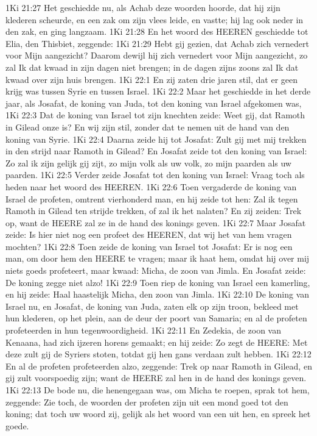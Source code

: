 1Ki 21:27  Het geschiedde nu, als Achab deze woorden hoorde, dat hij zijn klederen scheurde, en een zak om zijn vlees leide, en vastte; hij lag ook neder in den zak, en ging langzaam.
1Ki 21:28  En het woord des HEEREN geschiedde tot Elia, den Thisbiet, zeggende:
1Ki 21:29  Hebt gij gezien, dat Achab zich vernedert voor Mijn aangezicht? Daarom dewijl hij zich vernedert voor Mijn aangezicht, zo zal Ik dat kwaad in zijn dagen niet brengen; in de dagen zijns zoons zal Ik dat kwaad over zijn huis brengen.
1Ki 22:1  En zij zaten drie jaren stil, dat er geen krijg was tussen Syrie en tussen Israel.
1Ki 22:2  Maar het geschiedde in het derde jaar, als Josafat, de koning van Juda, tot den koning van Israel afgekomen was,
1Ki 22:3  Dat de koning van Israel tot zijn knechten zeide: Weet gij, dat Ramoth in Gilead onze is? En wij zijn stil, zonder dat te nemen uit de hand van den koning van Syrie.
1Ki 22:4  Daarna zeide hij tot Josafat: Zult gij met mij trekken in den strijd naar Ramoth in Gilead? En Josafat zeide tot den koning van Israel: Zo zal ik zijn gelijk gij zijt, zo mijn volk als uw volk, zo mijn paarden als uw paarden.
1Ki 22:5  Verder zeide Josafat tot den koning van Israel: Vraag toch als heden naar het woord des HEEREN.
1Ki 22:6  Toen vergaderde de koning van Israel de profeten, omtrent vierhonderd man, en hij zeide tot hen: Zal ik tegen Ramoth in Gilead ten strijde trekken, of zal ik het nalaten? En zij zeiden: Trek op, want de HEERE zal ze in de hand des konings geven.
1Ki 22:7  Maar Josafat zeide: Is hier niet nog een profeet des HEEREN, dat wij het van hem vragen mochten?
1Ki 22:8  Toen zeide de koning van Israel tot Josafat: Er is nog een man, om door hem den HEERE te vragen; maar ik haat hem, omdat hij over mij niets goeds profeteert, maar kwaad: Micha, de zoon van Jimla. En Josafat zeide: De koning zegge niet alzo!
1Ki 22:9  Toen riep de koning van Israel een kamerling, en hij zeide: Haal haastelijk Micha, den zoon van Jimla.
1Ki 22:10  De koning van Israel nu, en Josafat, de koning van Juda, zaten elk op zijn troon, bekleed met hun klederen, op het plein, aan de deur der poort van Samaria; en al de profeten profeteerden in hun tegenwoordigheid.
1Ki 22:11  En Zedekia, de zoon van Kenaana, had zich ijzeren horens gemaakt; en hij zeide: Zo zegt de HEERE: Met deze zult gij de Syriers stoten, totdat gij hen gans verdaan zult hebben.
1Ki 22:12  En al de profeten profeteerden alzo, zeggende: Trek op naar Ramoth in Gilead, en gij zult voorspoedig zijn; want de HEERE zal hen in de hand des konings geven.
1Ki 22:13  De bode nu, die henengegaan was, om Micha te roepen, sprak tot hem, zeggende: Zie toch, de woorden der profeten zijn uit een mond goed tot den koning; dat toch uw woord zij, gelijk als het woord van een uit hen, en spreek het goede.
